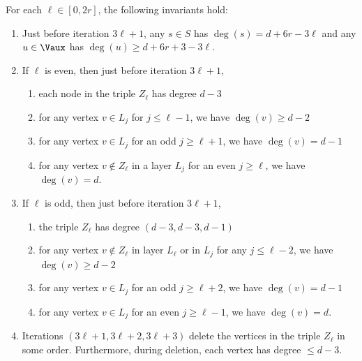 \begin{lemma}\label{lem:redn-inv}
For each $\ell\in [0,2r]$, the following invariants hold:
    \begin{enumerate}
    \item[Inv.~(1).] Just before iteration $3\ell+1$, any $s\in S$ has $\deg(s)=d+6r-3\ell$ and any $u\in \Vaux$ has $\deg(u)\geq d+6r+3-3\ell$.
     \item[Inv.~(2).] If $\ell$ is even, then just before iteration $3\ell+1$, 
    \begin{enumerate}
        \item each node in the triple $Z_{\ell}$ has degree $d-3$ 
        \item for any vertex $v\in L_{j}$ for $j\leq \ell-1$, we have $\deg(v)\geq d-2$
        \item for any vertex $v\in L_{j}$ for an odd $j \geq \ell+1$, we have $\deg(v)= d-1$ 
        \item for any vertex $v\not\in Z_{\ell}$ in a layer $L_j$ for an even $j\geq \ell$, we have $\deg(v) = d$.
    \end{enumerate}
    \item[Inv.~(3).] If $\ell$ is odd, then just before iteration $3\ell+1$,
     \begin{enumerate}
         \item the triple $Z_{\ell}$ has degree $(d-3,d-3,d-1)$
          \item for any vertex $v\not\in Z_{\ell}$ in layer $L_{\ell}$ or in $L_j$ for any $j\leq \ell-2$, we have $\deg(v)\geq d-2$
        \item for any vertex $v\in L_j$ for an odd $j\geq \ell+2$, we have $\deg(v)= d-1$ 
        \item for any vertex $v\in L_j$ for an even $j\geq \ell-1$, we have $\deg(v)= d$.
     \end{enumerate}
      \item[Inv.~(4).] Iterations $(3\ell+1,3\ell+2,3\ell+3)$ delete the vertices in the triple $Z_\ell$ in some order. Furthermore, during deletion, each vertex has degree $\leq d-3$.
\end{enumerate}  
\end{lemma}

